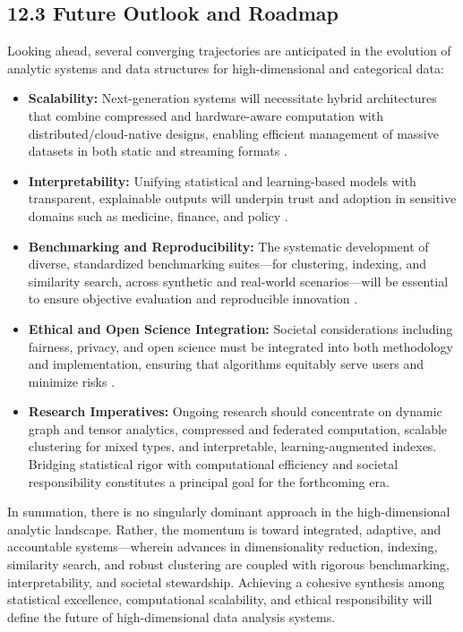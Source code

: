 \documentclass[11pt]{article}
\begin{document}
\subsection{12.3 Future Outlook and Roadmap}

Looking ahead, several converging trajectories are anticipated in the evolution of analytic systems and data structures for high-dimensional and categorical data:

\begin{itemize}
    \item \textbf{Scalability:} Next-generation systems will necessitate hybrid architectures that combine compressed and hardware-aware computation with distributed/cloud-native designs, enabling efficient management of massive datasets in both static and streaming formats \cite{ref84,ref87}.
    \item \textbf{Interpretability:} Unifying statistical and learning-based models with transparent, explainable outputs will underpin trust and adoption in sensitive domains such as medicine, finance, and policy \cite{ref110,ref116}.
    \item \textbf{Benchmarking and Reproducibility:} The systematic development of diverse, standardized benchmarking suites—for clustering, indexing, and similarity search, across synthetic and real-world scenarios—will be essential to ensure objective evaluation and reproducible innovation \cite{ref116}.
    \item \textbf{Ethical and Open Science Integration:} Societal considerations including fairness, privacy, and open science must be integrated into both methodology and implementation, ensuring that algorithms equitably serve users and minimize risks \cite{ref117,ref118}.
    \item \textbf{Research Imperatives:} Ongoing research should concentrate on dynamic graph and tensor analytics, compressed and federated computation, scalable clustering for mixed types, and interpretable, learning-augmented indexes. Bridging statistical rigor with computational efficiency and societal responsibility constitutes a principal goal for the forthcoming era.
\end{itemize}

In summation, there is no singularly dominant approach in the high-dimensional analytic landscape. Rather, the momentum is toward integrated, adaptive, and accountable systems—wherein advances in dimensionality reduction, indexing, similarity search, and robust clustering are coupled with rigorous benchmarking, interpretability, and societal stewardship. Achieving a cohesive synthesis among statistical excellence, computational scalability, and ethical responsibility will define the future of high-dimensional data analysis systems.



\end{document}

